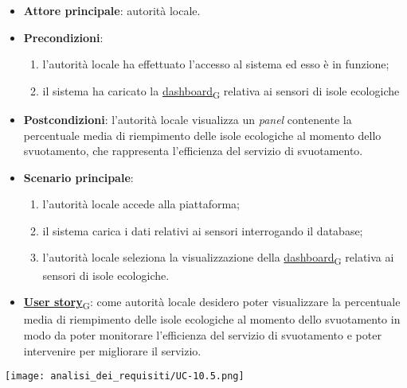\newpage

\begin{itemize}
	\item \textbf{Attore principale}: autorità locale.
	\item \textbf{Precondizioni}:
	      \begin{enumerate}
		      \item l'autorità locale ha effettuato l'accesso al sistema ed esso è in funzione;
		      \item il sistema ha caricato la \href{https://7last.github.io/docs/rtb/documentazione-interna/glossario\#dashboard}{dashboard\textsubscript{G}} relativa ai sensori di isole ecologiche
	      \end{enumerate}
	\item \textbf{Postcondizioni}: l'autorità locale visualizza un \textit{panel} contenente la percentuale media di riempimento delle isole ecologiche al momento dello svuotamento,
	      che rappresenta l'efficienza del servizio di svuotamento.
	\item \textbf{Scenario principale}:
	      \begin{enumerate}
		      \item l'autorità locale accede alla piattaforma;
		      \item il sistema carica i dati relativi ai sensori interrogando il database;
		      \item l'autorità locale seleziona la visualizzazione della \href{https://7last.github.io/docs/rtb/documentazione-interna/glossario\#dashboard}{dashboard\textsubscript{G}} relativa ai sensori di isole ecologiche.
	      \end{enumerate}
	\item \href{https://7last.github.io/docs/rtb/documentazione-interna/glossario\#user-story}{\textbf{User story}\textsubscript{G}}:
	      come autorità locale desidero poter visualizzare la percentuale media di riempimento delle isole ecologiche al momento dello svuotamento in modo da poter monitorare
	      l'efficienza del servizio di svuotamento e poter intervenire per migliorare il servizio.
\end{itemize}
\begin{center}
	\texttt{[image: analisi\_dei\_requisiti/UC-10.5.png]}
\end{center}

